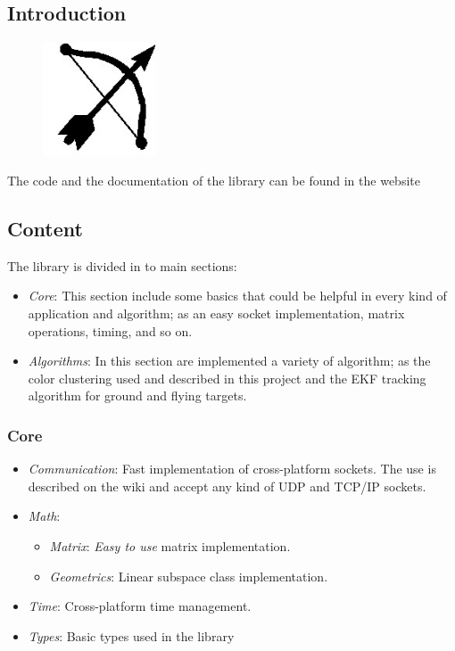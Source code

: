 \subsection{Introduction}
	\begin{figure}
		\includegraphics[width=0.3\textwidth]{../Images/c6/BOVIL.jpg}
		\label{fig:bovil}
	\end{figure}

	The code and the documentation of the library can be found in the website \cite{BOViL}
	
\subsection{Content}
	The library is divided in to main sections:
	\begin{itemize}
		\item \textit{Core}: This section include some basics that could be helpful in every kind of application and algorithm; as an easy socket implementation, matrix operations, timing, and so on.
		\item \textit{Algorithms}: In this section are implemented a variety of algorithm; as the color clustering used and described in this project and the EKF tracking algorithm for ground and flying targets.
	\end{itemize}
	
	\subsubsection{Core}
		\begin{itemize}
			\item \textit{Communication}: Fast implementation of cross-platform sockets. The use is described on the wiki and accept any kind of UDP and TCP/IP sockets.
			\item \textit{Math}:
				\begin{itemize}
					\item \textit{Matrix}: \textit{Easy to use} matrix implementation.
					\item \textit{Geometrics}: Linear subspace class implementation.
				\end{itemize}
			\item \textit{Time}: Cross-platform time management.
			\item \textit{Types}: Basic types used in the library
		\end{itemize}
		
